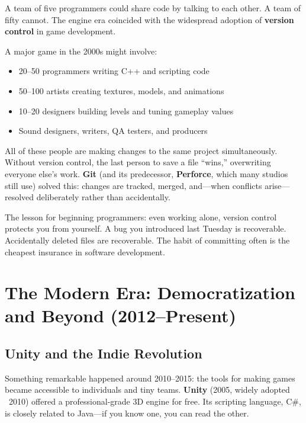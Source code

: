 \documentclass[11pt,letterpaper]{article}
\newcommand{\keyterm}[1]{\textbf{\textcolor{cssecondary}{#1}}}
\begin{document}
A team of five programmers could share code by talking to each other. A team of fifty cannot. The engine era coincided with the widespread adoption of \keyterm{version control} in game development.

\begin{debatebox}
A major game in the 2000s might involve:
\begin{itemize}[itemsep=2pt]
    \item 20--50 programmers writing C++ and scripting code
    \item 50--100 artists creating textures, models, and animations
    \item 10--20 designers building levels and tuning gameplay values
    \item Sound designers, writers, QA testers, and producers
\end{itemize}
All of these people are making changes to the same project simultaneously. Without version control, the last person to save a file ``wins,'' overwriting everyone else's work. \textbf{Git} (and its predecessor, \textbf{Perforce}, which many studios still use) solved this: changes are tracked, merged, and---when conflicts arise---resolved deliberately rather than accidentally.

The lesson for beginning programmers: even working alone, version control protects you from yourself. A bug you introduced last Tuesday is recoverable. Accidentally deleted files are recoverable. The habit of committing often is the cheapest insurance in software development.
\end{debatebox}

\section{The Modern Era: Democratization and Beyond (2012--Present)}

\subsection{Unity and the Indie Revolution}

Something remarkable happened around 2010--2015: the tools for making games became accessible to individuals and tiny teams. \textbf{Unity} (2005, widely adopted ~2010) offered a professional-grade 3D engine for free. Its scripting language, C\#, is closely related to Java---if you know one, you can read the other.
\end{document}
